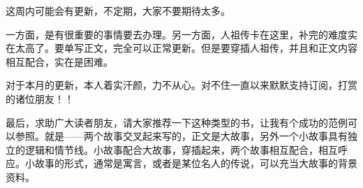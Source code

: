 \begin{this_body}
这周内可能会有更新，不定期，大家不要期待太多。

一方面，是有很重要的事情要去办理。另一方面，人祖传卡在这里，补完的难度实在太高了。要单写正文，完全可以正常更新。但是要穿插人祖传，并且和正文内容相互配合，实在是困难。

对于本月的更新，本人着实汗颜，力不从心。对不住一直以来默默支持订阅，打赏的诸位朋友！！

最后，求助广大读者朋友，请大家推荐一下这种类型的书，让我有个成功的范例可以参照。就是——两个故事交叉起来写的，正文是大故事，另外一个小故事具有独立的逻辑和情节线。小故事配合大故事，穿插起来，两个故事相互配合，相互呼应。小故事的形式，通常是寓言，或者是某位名人的传说，可以充当大故事的背景资料。

\end{this_body}

